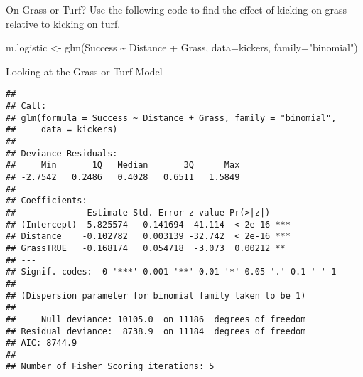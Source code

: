 \documentclass[
  ignorenonframetext,
]{beamer}
\newenvironment{Shaded}{\begin{snugshade}}{\end{snugshade}}
\newcommand{\AttributeTok}[1]{\textcolor[rgb]{0.77,0.63,0.00}{#1}}
\newcommand{\FunctionTok}[1]{\textcolor[rgb]{0.00,0.00,0.00}{#1}}
\newcommand{\NormalTok}[1]{#1}
\newcommand{\OtherTok}[1]{\textcolor[rgb]{0.56,0.35,0.01}{#1}}
\newcommand{\SpecialCharTok}[1]{\textcolor[rgb]{0.00,0.00,0.00}{#1}}
\newcommand{\StringTok}[1]{\textcolor[rgb]{0.31,0.60,0.02}{#1}}
\begin{document}
\begin{frame}[fragile]{On Grass or Turf?}
\protect\hypertarget{on-grass-or-turf}{}
Use the following code to find the effect of kicking on grass relative
to kicking on turf.

\begin{Shaded}
\begin{Highlighting}[]
\NormalTok{m.logistic }\OtherTok{\textless{}{-}} \FunctionTok{glm}\NormalTok{(Success }\SpecialCharTok{\textasciitilde{}}\NormalTok{ Distance }\SpecialCharTok{+}\NormalTok{ Grass,}
                  \AttributeTok{data=}\NormalTok{kickers, }\AttributeTok{family=}\StringTok{"binomial"}\NormalTok{)}
\end{Highlighting}
\end{Shaded}
\end{frame}

\begin{frame}[fragile]{Looking at the Grass or Turf Model}
\protect\hypertarget{looking-at-the-grass-or-turf-model}{}
\begin{verbatim}
## 
## Call:
## glm(formula = Success ~ Distance + Grass, family = "binomial", 
##     data = kickers)
## 
## Deviance Residuals: 
##     Min       1Q   Median       3Q      Max  
## -2.7542   0.2486   0.4028   0.6511   1.5849  
## 
## Coefficients:
##              Estimate Std. Error z value Pr(>|z|)    
## (Intercept)  5.825574   0.141694  41.114  < 2e-16 ***
## Distance    -0.102782   0.003139 -32.742  < 2e-16 ***
## GrassTRUE   -0.168174   0.054718  -3.073  0.00212 ** 
## ---
## Signif. codes:  0 '***' 0.001 '**' 0.01 '*' 0.05 '.' 0.1 ' ' 1
## 
## (Dispersion parameter for binomial family taken to be 1)
## 
##     Null deviance: 10105.0  on 11186  degrees of freedom
## Residual deviance:  8738.9  on 11184  degrees of freedom
## AIC: 8744.9
## 
## Number of Fisher Scoring iterations: 5
\end{verbatim}
\end{frame}
\end{document}
